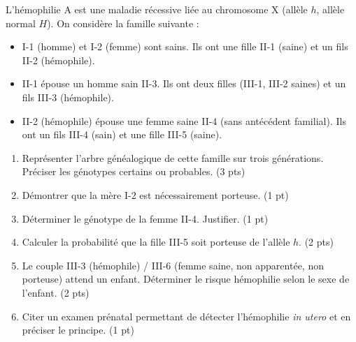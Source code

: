 \documentclass[11pt]{article}
\begin{document}
\begin{exercice}
L'hémophilie A est une maladie récessive liée au chromosome X (allèle $h$, allèle normal $H$). On considère la famille suivante :
\begin{itemize}
    \item I-1 (homme) et I-2 (femme) sont sains. Ils ont une fille II-1 (saine) et un fils II-2 (hémophile).
    \item II-1 épouse un homme sain II-3. Ils ont deux filles (III-1, III-2 saines) et un fils III-3 (hémophile).
    \item II-2 (hémophile) épouse une femme saine II-4 (sans antécédent familial). Ils ont un fils III-4 (sain) et une fille III-5 (saine).
\end{itemize}
\begin{enumerate}
    \item Représenter l'arbre généalogique de cette famille sur trois générations. Préciser les génotypes certains ou probables. (3 pts)
    \item Démontrer que la mère I-2 est nécessairement porteuse. (1 pt)
    \item Déterminer le génotype de la femme II-4. Justifier. (1 pt)
    \item Calculer la probabilité que la fille III-5 soit porteuse de l'allèle $h$. (2 pts)
    \item Le couple III-3 (hémophile) / III-6 (femme saine, non apparentée, non porteuse) attend un enfant. Déterminer le risque hémophilie selon le sexe de l'enfant. (2 pts)
    \item Citer un examen prénatal permettant de détecter l'hémophilie \textit{in utero} et en préciser le principe. (1 pt)
\end{enumerate}
\end{exercice}
\end{document}
